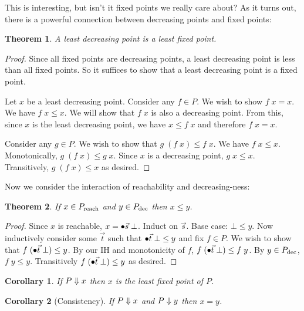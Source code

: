 \documentclass{article}
\newtheorem{theorem}{Theorem}
\newtheorem{corollary}{Corollary}
\begin{document}
This is interesting, but isn't it fixed points we really care about? As it turns
out, there is a powerful connection between decreasing points and fixed points:

\begin{theorem}
  A least decreasing point is a least fixed point.
\end{theorem}

\begin{proof}
  Since all fixed points are decreasing points, a least decreasing point is less
  than all fixed points. So it suffices to show that a least decreasing point is
  a fixed point.

  Let $x$ be a least decreasing point. Consider any $f \in P$. We wish to show
  $f\;x = x$. We have $f\; x \le x$. We will show that $f\;x$ is also a
  decreasing point. From this, since $x$ is the least decreasing point, we have
  $x \le f\;x$ and therefore $f\;x = x$.

  Consider any $g \in P$. We wish to show that $g\;(f\;x) \le f\; x$. We have
  $f\;x \le x$. Monotonically, $g\;(f\;x) \le g\;x$. Since $x$ is a decreasing
  point, $g\;x \le x$. Transitively, $g\;(f\;x) \le x$ as desired.
\end{proof}

Now we consider the interaction of reachability and decreasing-ness:

\begin{theorem}
  If $x \in {P}_{\text{reach}}$ and $y \in {P}_{\text{dec}}$ then $x \le y$.
  \label{thm:reachable<=dec}
\end{theorem}

\begin{proof}
  Since $x$ is reachable, $x = {\bullet\vec{s}}\; \bot$. Induct on $\vec{s}$. Base case:
  $\bot \le y$. Now inductively consider some $\vec{t}$ such that ${\bullet\vec{t}}\;
  \bot \le y$ and fix $f \in P$. We wish to show that $f\; ({\bullet\vec{t}}\; \bot) \le
  y$. By our IH and monotonicity of $f$, $f\;({\bullet\vec{t}}\; \bot) \le f\; y$. By $y
  \in {P}_{\text{dec}}$, $f\;y \le y$. Transitively $f\; ({\bullet\vec{t}}\; \bot) \le y$ as
  desired.
\end{proof}

\begin{corollary}
  If $P \Downarrow x$ then $x$ is the least fixed point of $P$.
\end{corollary}

\begin{corollary}[Consistency]
  If $P \Downarrow x$ and $P \Downarrow y$ then $x = y$.
  \label{cor:consistency}
\end{corollary}
\end{document}
